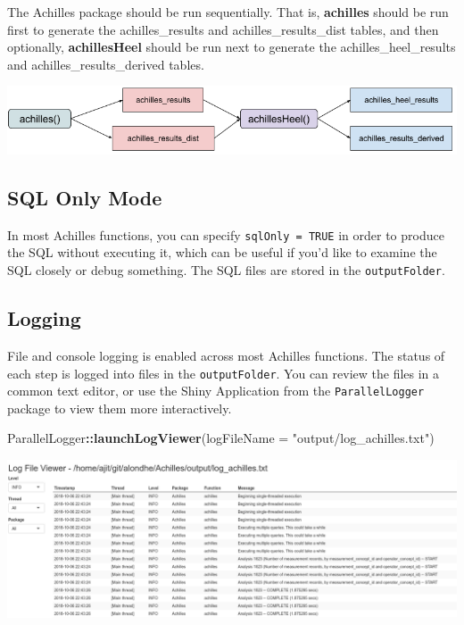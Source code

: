 \documentclass[]{article}
\newenvironment{Shaded}{\begin{snugshade}}{\end{snugshade}}
\newcommand{\KeywordTok}[1]{\textcolor[rgb]{0.13,0.29,0.53}{\textbf{#1}}}
\newcommand{\DataTypeTok}[1]{\textcolor[rgb]{0.13,0.29,0.53}{#1}}
\newcommand{\StringTok}[1]{\textcolor[rgb]{0.31,0.60,0.02}{#1}}
\newcommand{\OperatorTok}[1]{\textcolor[rgb]{0.81,0.36,0.00}{\textbf{#1}}}
\newcommand{\NormalTok}[1]{#1}
\begin{document}
The Achilles package should be run sequentially. That is,
\textbf{achilles} should be run first to generate the achilles\_results
and achilles\_results\_dist tables, and then optionally,
\textbf{achillesHeel} should be run next to generate the
achilles\_heel\_results and achilles\_results\_derived tables.

\includegraphics{../inst/doc/achilles_flowchart.png}

\subsection{SQL Only Mode}\label{sql-only-mode}

In most Achilles functions, you can specify \texttt{sqlOnly\ =\ TRUE} in
order to produce the SQL without executing it, which can be useful if
you'd like to examine the SQL closely or debug something. The SQL files
are stored in the \texttt{outputFolder}.

\subsection{Logging}\label{logging}

File and console logging is enabled across most Achilles functions. The
status of each step is logged into files in the \texttt{outputFolder}.
You can review the files in a common text editor, or use the Shiny
Application from the \texttt{ParallelLogger} package to view them more
interactively.

\begin{Shaded}
\begin{Highlighting}[]
\NormalTok{ParallelLogger}\OperatorTok{::}\KeywordTok{launchLogViewer}\NormalTok{(}\DataTypeTok{logFileName =} \StringTok{"output/log_achilles.txt"}\NormalTok{)}
\end{Highlighting}
\end{Shaded}

\includegraphics{../inst/doc/logging_screenshot.png}
\end{document}
